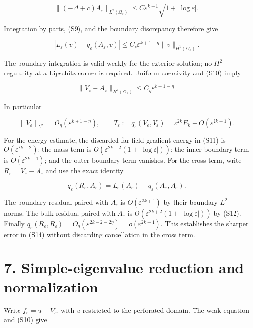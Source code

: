 \documentclass[11pt]{article}
\begin{document}
\[
 \|(-\Delta+c)A_\varepsilon\|_{L^2(\Omega_\varepsilon)}
 \le C\varepsilon^{k+1}\sqrt{1+|\log\varepsilon|}.
\]

Integration by parts, (S9), and the boundary discrepancy therefore give

\[
 |L_\varepsilon(v)-q_\varepsilon(A_\varepsilon,v)|
 \le C_\eta\varepsilon^{k+1-\eta}
       \|v\|_{H^1(\Omega_\varepsilon)}.
\]

The boundary integration is valid weakly for the exterior solution; no
\(H^2\) regularity at a Lipschitz corner is required. Uniform coercivity
and (S10) imply

\[
 \|V_\varepsilon-A_\varepsilon\|_{H^1(\Omega_\varepsilon)}
 \le C_\eta\varepsilon^{k+1-\eta}.
 \tag{S13}
\]

In particular

\[
 \|V_\varepsilon\|_{L^2}=O_\eta(\varepsilon^{k+1-\eta}),\qquad
 T_\varepsilon:=q_\varepsilon(V_\varepsilon,V_\varepsilon)
 =\varepsilon^{2k}E_k+O(\varepsilon^{2k+1}).
 \tag{S14}
\]

For the energy estimate, the discarded far-field gradient energy in
(S11) is \(O(\varepsilon^{2k+2})\); the mass term is
\(O(\varepsilon^{2k+2}(1+|\log\varepsilon|))\); the inner-boundary term
is \(O(\varepsilon^{2k+1})\); and the outer-boundary term vanishes. For
the cross term, write \(R_\varepsilon=V_\varepsilon-A_\varepsilon\) and
use the exact identity

\[
 q_\varepsilon(R_\varepsilon,A_\varepsilon)
 =L_\varepsilon(A_\varepsilon)-q_\varepsilon(A_\varepsilon,A_\varepsilon).
\]

The boundary residual paired with \(A_\varepsilon\) is
\(O(\varepsilon^{2k+1})\) by their boundary \(L^2\) norms. The bulk
residual paired with \(A_\varepsilon\) is
\(O(\varepsilon^{2k+2}(1+|\log\varepsilon|))\) by (S12). Finally
\(q_\varepsilon(R_\varepsilon,R_\varepsilon)
=O_\eta(\varepsilon^{2k+2-2\eta})=o(\varepsilon^{2k+1})\). This
establishes the sharper error in (S14) without discarding cancellation
in the cross term.

\section{7. Simple-eigenvalue reduction and
normalization}\label{simple-eigenvalue-reduction-and-normalization}

Write \(f_\varepsilon=u-V_\varepsilon\), with \(u\) restricted to the
perforated domain. The weak equation and (S10) give
\end{document}
